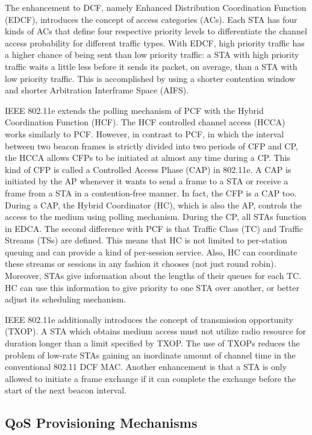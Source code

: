 The enhancement to DCF, namely Enhanced Distribution Coordination Function (EDCF), introduces the concept of access categories (ACs). Each STA has four kinds of ACs that define four respective priority levels to differentiate the channel access probability for different traffic types. With EDCF, high priority traffic has a higher chance of being sent than low priority traffic: a STA with high priority traffic waits a little less before it sends its packet, on average, than a STA with low priority traffic. This is accomplished by using a shorter contention window and shorter Arbitration Interframe Space (AIFS).

IEEE 802.11e extends the polling mechanism of PCF with the Hybrid Coordination Function (HCF). The HCF controlled channel access (HCCA) works similarly to PCF. However, in contrast to PCF, in which the interval between two beacon frames is strictly divided into two periods of CFP and CP, the HCCA allows CFPs to be initiated at almost any time during a CP. This kind of CFP is called a Controlled Access Phase (CAP) in 802.11e. A CAP is initiated by the AP whenever it wants to send a frame to a STA or receive a frame from a STA in a contention-free manner. In fact, the CFP is a CAP too. During a CAP, the Hybrid Coordinator (HC), which is also the AP, controls the access to the medium using polling mechanism. During the CP, all STAs function in EDCA. The second difference with PCF is that Traffic Class (TC) and Traffic Streams (TSs) are defined. This means that HC is not limited to per-station queuing and can provide a kind of per-session service. Also, HC can coordinate these streams or sessions in any fashion it chooses (not just round robin). Moreover, STAs give information about the lengths of their queues for each TC. HC can use this information to give priority to one STA over another, or better adjust its scheduling mechanism.

IEEE 802.11e additionally introduces the concept of transmission opportunity (TXOP). A STA which obtains medium access must not utilize radio resource for duration longer than a limit specified by TXOP. The use of TXOPs reduces the problem of low-rate STAs gaining an inordinate amount of channel time in the conventional 802.11 DCF MAC. Another enhancement is that a STA is only allowed to initiate a frame exchange if it can complete the exchange before the start of the next beacon interval.
\subsection{QoS Provisioning Mechanisms}
\label{qos}

